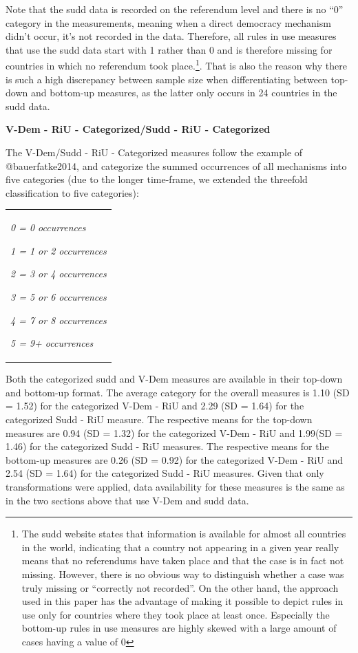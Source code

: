 \documentclass[]{article}
\let\rmarkdownfootnote\footnote%
\def\footnote{\protect\rmarkdownfootnote}
\begin{document}
Note that the sudd data is recorded on the referendum level and there is
no ``0'' category in the measurements, meaning when a direct democracy
mechanism didn't occur, it's not recorded in the data. Therefore, all
rules in use measures that use the sudd data start with 1 rather than 0
and is therefore missing for countries in which no referendum took
place.\footnote{The sudd website states that information is available
  for almost all countries in the world, indicating that a country not
  appearing in a given year really means that no referendums have taken
  place and that the case is in fact not missing. However, there is no
  obvious way to distinguish whether a case was truly missing or
  ``correctly not recorded''. On the other hand, the approach used in
  this paper has the advantage of making it possible to depict rules in
  use only for countries where they took place at least once. Especially
  the bottom-up rules in use measures are highly skewed with a large
  amount of cases having a value of 0}. That is also the reason why
there is such a high discrepancy between sample size when
differentiating between top-down and bottom-up measures, as the latter
only occurs in 24 countries in the sudd data.

\textbf{V-Dem - RiU - Categorized/Sudd - RiU - Categorized}

The V-Dem/Sudd - RiU - Categorized measures follow the example of
@bauerfatke2014, and categorize the summed occurrences of all mechanisms
into five categories (due to the longer time-frame, we extended the
threefold classification to five categories):

\vspace{0.01cm}

\begin{tabular}{p{13.5cm}}
\small
 \textit{0 = 0 occurrences}
    
 \textit{1 = 1 or 2 occurrences}
    
 \textit{2 = 3 or 4 occurrences}
    
 \textit{3 = 5 or 6 occurrences}
    
 \textit{4 = 7 or 8 occurrences}
    
 \textit{5 = 9+ occurrences}
\end{tabular}

Both the categorized sudd and V-Dem measures are available in their
top-down and bottom-up format. The average category for the overall
measures is 1.10 (SD = 1.52) for the categorized V-Dem - RiU and 2.29
(SD = 1.64) for the categorized Sudd - RiU measure. The respective means
for the top-down measures are 0.94 (SD = 1.32) for the categorized V-Dem
- RiU and 1.99(SD = 1.46) for the categorized Sudd - RiU measures. The
respective means for the bottom-up measures are 0.26 (SD = 0.92) for the
categorized V-Dem - RiU and 2.54 (SD = 1.64) for the categorized Sudd -
RiU measures. Given that only transformations were applied, data
availability for these measures is the same as in the two sections above
that use V-Dem and sudd data.
\end{document}
